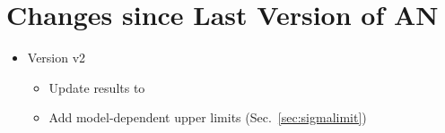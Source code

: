\section{Changes since Last Version of AN}
\label{sec:changes}

\begin{itemize}
\item Version v2
  \begin{itemize}
  \item Update results to \lumi
  \item Add model-dependent upper limits (Sec.~\ref{sec:sigmalimit})
  \end{itemize}
\end{itemize}
